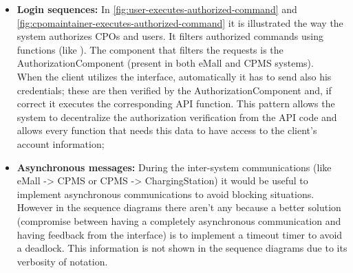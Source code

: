 \begin{itemize}
    \item \textbf{Login sequences:} In \autoref{fig:user-executes-authorized-command} and \autoref{fig:cpomaintainer-executes-authorized-command} it is illustrated the way the system authorizes \acp{CPO} and users. It filters authorized commands using functions (like \cite{ref:command-pattern}). The component that filters the requests is the AuthorizationComponent (present in both \ac{eMall} and \ac{CPMS} systems).\\
          When the client utilizes the interface, automatically it has to send also his credentials; these are then verified by the AuthorizationComponent and, if correct it executes the corresponding \ac{API} function. This pattern allows the system to decentralize the authorization verification from the \ac{API} code and allows every function that needs this data to have access to the client's account information;
    \item \textbf{Asynchronous messages:} During the inter-system communications (like \ac{eMall} -> \ac{CPMS} or \ac{CPMS} -> ChargingStation) it would be useful to implement asynchronous communications to avoid blocking situations. However in the sequence diagrams there aren't any because a better solution (compromise between having a completely asynchronous communication and having feedback from the interface) is to implement a timeout timer to avoid a deadlock. This information is not shown in the sequence diagrams due to its verbosity of notation.

\end{itemize}
\clearpage
